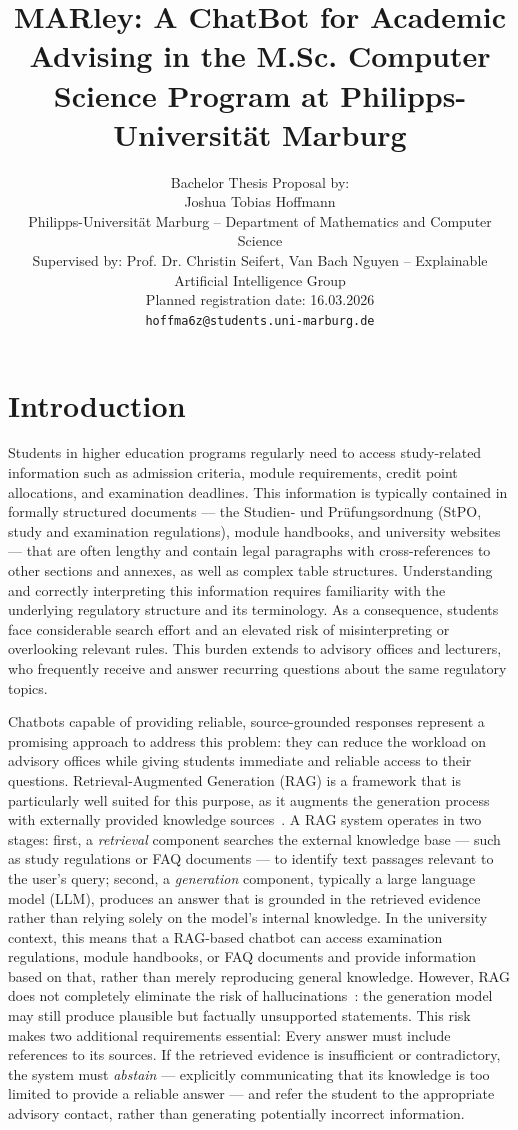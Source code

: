 \documentclass[10pt,twocolumn]{article}
\title{\Large\bfseries MARley: A ChatBot for Academic Advising in the M.Sc. Computer Science Program at Philipps-Universit\"at Marburg}
\author{Bachelor Thesis Proposal by:\\
Joshua Tobias Hoffmann\\
\small Philipps-Universit\"at Marburg -- Department of Mathematics and Computer Science\\
\small Supervised by: Prof. Dr. Christin Seifert, Van Bach Nguyen -- Explainable Artificial Intelligence Group\\
\small Planned registration date: 16.03.2026\\
\small \texttt{hoffma6z@students.uni-marburg.de}}
\date{}
\begin{document}
\maketitle

\section{Introduction}

Students in higher education programs regularly need to access study-related information such as admission criteria, module requirements, credit point allocations, and examination deadlines. This information is typically contained in formally structured documents --- the Studien- und Pr\"ufungsordnung (StPO, study and examination regulations), module handbooks, and university websites --- that are often lengthy and contain legal paragraphs with cross-references to other sections and annexes, as well as complex table structures. Understanding and correctly interpreting this information requires familiarity with the underlying regulatory structure and its terminology. As a consequence, students face considerable search effort and an elevated risk of misinterpreting or overlooking relevant rules. This burden extends to advisory offices and lecturers, who frequently receive and answer recurring questions about the same regulatory topics.

Chatbots capable of providing reliable, source-grounded responses represent a promising approach to address this problem: they can reduce the workload on advisory offices while giving students immediate and reliable access to their questions. Retrieval-Augmented Generation (RAG) is a framework that is particularly well suited for this purpose, as it augments the generation process with externally provided knowledge sources~\cite{lewis2021rag}. A RAG system operates in two stages: first, a \emph{retrieval} component searches the external knowledge base --- such as study regulations or FAQ documents --- to identify text passages relevant to the user's query; second, a \emph{generation} component, typically a large language model (LLM), produces an answer that is grounded in the retrieved evidence rather than relying solely on the model's internal knowledge. In the university context, this means that a RAG-based chatbot can access examination regulations, module handbooks, or FAQ documents and provide information based on that, rather than merely reproducing general knowledge. However, RAG does not completely eliminate the risk of hallucinations~\cite{ji2023hallucination}: the generation model may still produce plausible but factually unsupported statements. This risk makes two additional requirements essential: Every answer must include references to its sources. If the retrieved evidence is insufficient or contradictory, the system must \emph{abstain} — explicitly communicating that its knowledge is too limited to provide a reliable answer — and refer the student to the appropriate advisory contact, rather than generating potentially incorrect information.
\end{document}
